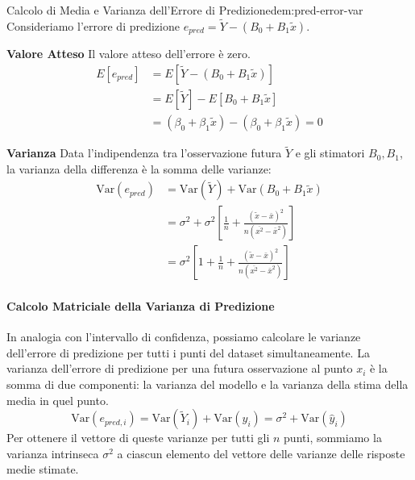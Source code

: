 \begin{dimostrazione}{Calcolo di Media e Varianza dell'Errore di
		Predizione}{dem:pred-error-var}
	Consideriamo l'errore di predizione \( e_{pred} = \tilde{Y} - (B_0 +
	B_1\tilde{x}) \).

	\textbf{Valore Atteso}
	Il valore atteso dell'errore è zero.
	\begin{align*}
		E[e_{pred}] & = E[\tilde{Y} - (B_0 + B_1\tilde{x})]       \\
		            & = E[\tilde{Y}] - E[B_0 + B_1\tilde{x}]      \\
		            & = (\beta_0 + \beta_1\tilde{x}) - (\beta_0 +
		\beta_1\tilde{x}) = 0
	\end{align*}

	\textbf{Varianza}
	Data l'indipendenza tra l'osservazione futura \(\tilde{Y}\) e gli stimatori
	\(B_0, B_1\), la varianza della differenza è la somma delle varianze:
	\begin{align*}
		\text{Var}(e_{pred}) & = \text{Var}(\tilde{Y}) + \text{Var}(B_0 +
		B_1\tilde{x})                                                     \\
		                     & = \sigma^2 + \sigma^2 \left[ \frac{1}{n} +
			\frac{(\tilde{x} -
		\bar{x})^2}{n(\overline{x^2}-\bar{x}^2)} \right]                  \\
		                     & = \sigma^2 \left[ 1 + \frac{1}{n} +
			\frac{(\tilde{x} -
				\bar{x})^2}{n(\overline{x^2}-\bar{x}^2)} \right]
	\end{align*}
\end{dimostrazione}

\paragraph{Calcolo Matriciale della Varianza di Predizione}
In analogia con l'intervallo di confidenza, possiamo calcolare le varianze
dell'errore di predizione per tutti i punti del dataset simultaneamente. La
varianza dell'errore di predizione per una futura osservazione al punto \(x_i\)
è la somma di due componenti: la varianza del modello e la varianza della stima
della media in quel punto.
\[
	\text{Var}(e_{pred, i}) = \text{Var}(\tilde{Y}_i) + \text{Var}(\hat{y}_i) =
	\sigma^2 + \text{Var}(\hat{y}_i)
\]
Per ottenere il vettore di queste varianze per tutti gli \(n\) punti, sommiamo
la varianza intrinseca \(\sigma^2\) a ciascun elemento del vettore delle
varianze delle risposte medie stimate.

